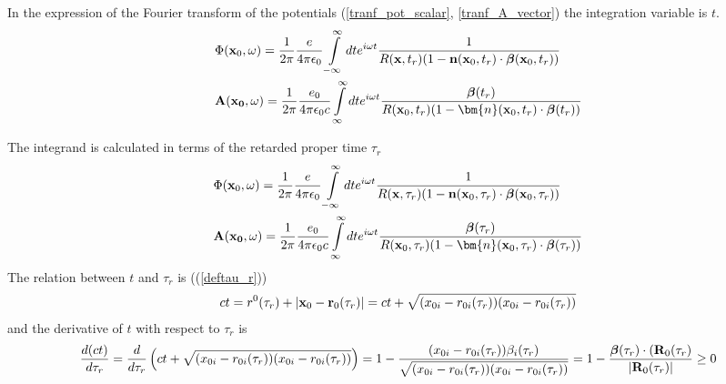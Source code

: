 In the expression of the Fourier transform of the potentials (\ref{tranf_pot_scalar}, \ref{tranf_A_vector}) the integration variable is $t$. 
    \begin{align}
        &\Phi({\bf x}_0,\omega)=\frac1{2\pi}\frac{e}{4\pi\epsilon_0}\int\limits_{-\infty}^{\infty}dte^{i\omega t}\frac{1}{R({\bf x},t_r)(1-{\bf n}({\bf x}_0,t_r)\cdot{\boldsymbol{\beta}}({\bf x}_0,t_r))}\\
        &{\bf A}({\bf x_0},\omega)=\frac1{2\pi}\frac{e_0}{4\pi\epsilon_0c}\int\limits_{\infty}^{\infty}dte^{i\omega t}\frac{{\boldsymbol{\beta}}(t_r)}{R({\bf x}_0,t_r)(1-{\bm{n}}({\bf x}_0,t_r)\cdot{\boldsymbol{\beta}}(t_r))}
    \end{align}

The integrand is calculated in terms of the retarded proper time $\tau_r$
    \begin{align}
        &\Phi({\bf x}_0,\omega)=\frac1{2\pi}\frac{e}{4\pi\epsilon_0}\int\limits_{-\infty}^{\infty}dte^{i\omega t}\frac{1}{R({\bf x},\tau_r)(1-{\bf n}({\bf x}_0,\tau_r)\cdot{\boldsymbol{\beta}}({\bf x}_0,\tau_r))}\label{tranf_pot_scalar_retarded}\\
        &{\bf A}({\bf x_0},\omega)=\frac1{2\pi}\frac{e_0}{4\pi\epsilon_0c}\int\limits_{\infty}^{\infty}dte^{i\omega t}\frac{{\boldsymbol{\beta}}(\tau_r)}{R({\bf x}_0,\tau_r)(1-{\bm{n}}({\bf x}_0,\tau_r)\cdot{\boldsymbol{\beta}}(\tau_r))}\label{tranf_A_vector_retarded}
    \end{align}
The relation between $t$ and $\tau_r$ is ((\ref{deftau_r}))
    \begin{align}
        ct=  r^0(\tau_r)+|{\bf x}_0-{\bf r}_0(\tau_r)|=ct+\sqrt{(x_{0i}-r_{0i}(\tau_r))(x_{0i}-r_{0i}(\tau_r))}\label{taur_def}
    \end{align}
    and the derivative of $t$ with respect to $\tau_r$ is
    \begin{align} 
        \frac{d(ct)}{d\tau_r}=\frac{d}{d\tau_r}\left(ct+\sqrt{(x_{0i}-r_{0i}(\tau_r))(x_{0i}-r_{0i}(\tau_r))}\right)=1-\frac{(x_{0i}-r_{0i}(\tau_r))\beta_i(\tau_r)}{\sqrt{(x_{0i}-r_{0i}(\tau_r))(x_{0i}-r_{0i}(\tau_r))}}=1-\frac{{\boldsymbol{\beta}}(\tau_r)\cdot({\bf R}_0(\tau_r)}{|{\bf R}_0(\tau_r)|}\ge 0
    \end{align}

